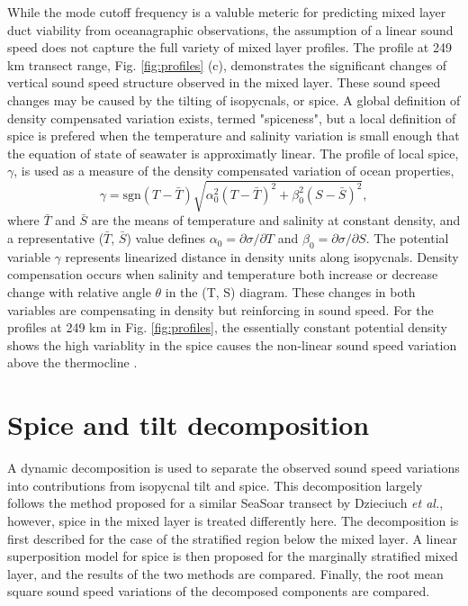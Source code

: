 \documentclass[preprint,NumberedRefs]{JASA}
\begin{document}
While the mode cutoff frequency is a valuble meteric for predicting mixed layer duct viability from oceanagraphic observations, the assumption of a linear sound speed does not capture the full variety of mixed layer profiles. The profile at 249 km transect range, Fig. \ref{fig:profiles} (c), demonstrates the significant changes of vertical sound speed structure observed in the mixed layer. These sound speed changes may be caused by the tilting of isopycnals, or spice. A global definition of density compensated variation exists, termed "spiceness"\citep{mcdougall2015spiciness}, but a local definition of spice is prefered when the temperature and salinity variation is small enough that the equation of state of seawater is approximatly linear\citep{ferrari2000}. The profile of local spice, $\gamma$, is used as a measure of the density compensated variation \citep{klymak2015spice} of ocean properties,
\begin{equation}
    \gamma=\textrm{sgn}(T-\bar{T}) \sqrt{\alpha_0^2(T-\bar{T})^2 +\beta_0^2(S-\bar{S})^2},
    \label{eq:gamma}
\end{equation}
where $\bar{T}$ and $\bar{S}$ are the means of temperature and salinity at constant density, and a representative ($\bar{T}$, $\bar{S}$) value defines $\alpha_0=\partial \sigma / \partial T$ and $\beta_0=\partial \sigma / \partial S$. The potential variable $\gamma$ represents linearized distance in density units along isopycnals. Density compensation occurs when salinity and temperature both increase or decrease change with relative angle $\theta$ in the (T, S) diagram. These changes in both variables are compensating in density but reinforcing in sound speed. For the profiles at 249 km in Fig. \ref{fig:profiles}, the essentially constant potential density shows the high variablity in the spice causes the non-linear sound speed variation above the thermocline .


\section{\label{sec:decomposition}Spice and tilt decomposition}
A dynamic decomposition is used to separate the observed sound speed variations into contributions from isopycnal tilt and spice. This decomposition largely follows the method proposed for a similar SeaSoar transect by Dzieciuch \emph{et al.}\citep{dzieciuch2004}, however, spice in the mixed layer is treated differently here. The decomposition is first described for the case of the stratified region below the mixed layer. A linear superposition model for spice is then proposed for the marginally stratified mixed layer, and the results of the two methods are compared. Finally, the root mean square sound speed variations of the decomposed components are compared.
\end{document}
